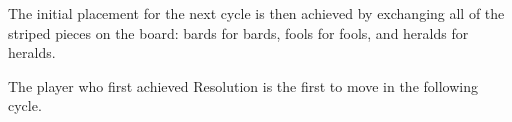   The initial placement for the next cycle is then achieved by
  exchanging all of the striped pieces on the board: bards for
  bards, fools for fools, and heralds for heralds.

  The player who first achieved Resolution is the first to move
  in the following cycle.

 


